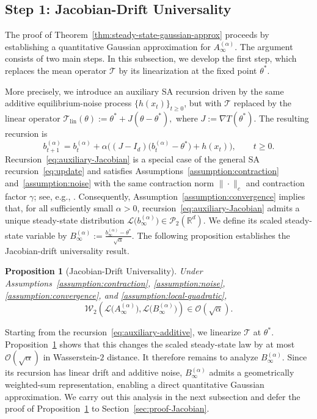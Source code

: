 \documentclass[11pt,letterpaper]{article}
\theoremstyle{plain}
\newtheorem{proposition}{Proposition}
\theoremstyle{definition}
\theoremstyle{remark}
\newcommand{\mT}{\mathcal{T}}
\newcommand{\W}{\mathcal{W}}
\newcommand{\law}{\mathcal{L}}
\begin{document}
\subsection{Step 1: Jacobian-Drift Universality}
\label{sec:Jacobian}

The proof of Theorem~\ref{thm:steady-state-gaussian-approx} proceeds by
establishing a quantitative Gaussian approximation for
\(A_\infty^{(\alpha)}\). The argument
consists of two main steps. In this subsection, we develop the first step,
which replaces the mean operator \(\mT\) by its linearization at the fixed
point \(\theta^*\).

More precisely, we introduce an auxiliary SA recursion driven by the same
additive equilibrium-noise process \(\{h(x_t)\}_{t\geq0}\), but with \(\mT\) replaced by
the linear operator $\mT_{\mathrm{lin}}(\theta)
    :=
    \theta^*+J(\theta-\theta^*),$ where $J:=\nabla T(\theta^*)$. The resulting recursion is
\begin{equation}
\label{eq:auxiliary-Jacobian}
    b_{t+1}^{(\alpha)}
    =
    b_t^{(\alpha)}
    +
    \alpha\Big(
        (J-I_d)\bigl(b_t^{(\alpha)}-\theta^*\bigr)
        +
        h(x_t)
    \Big),
    \qquad t\geq 0.
\end{equation}
Recursion~\eqref{eq:auxiliary-Jacobian} is a special case of the general SA
recursion~\eqref{eq:update} and satisfies
Assumptions~\ref{assumption:contraction} and~\ref{assumption:noise}
with the same contraction norm \(\|\cdot\|_c\) and contraction factor
\(\gamma\); see, e.g., \cite[Proposition~6.4]{arora2021alternative}.
Consequently, Assumption~\ref{assumption:convergence} implies that, for all
sufficiently small \(\alpha>0\),
recursion~\eqref{eq:auxiliary-Jacobian} admits a unique steady-state
distribution $\law\bigl(b_\infty^{(\alpha)}\bigr)
    \in \mathcal{P}_2(\mathbb{R}^d).$ We define its scaled steady-state variable by $B_\infty^{(\alpha)}
    :=
    \frac{b_\infty^{(\alpha)}-\theta^*}{\sqrt{\alpha}}.$ The following proposition establishes the Jacobian-drift universality result.


\begin{proposition}[Jacobian-Drift Universality]
\label{prop:Jacobian}
Under Assumptions~\ref{assumption:contraction},
\ref{assumption:noise}, \ref{assumption:convergence}, and
\ref{assumption:local-quadratic},
\[
    \W_2\left(
        \law\bigl(A_\infty^{(\alpha)}\bigr),
        \law\bigl(B_\infty^{(\alpha)}\bigr)
    \right)
   \in
    \mathcal{O}(\sqrt{\alpha}).
\]
\end{proposition}
Starting from the recursion~\eqref{eq:auxiliary-additive},
we linearize \(\mT\) at \(\theta^*\). Proposition~\ref{prop:Jacobian} shows
that this changes the scaled steady-state law by at most
\(\mathcal O(\sqrt{\alpha})\) in Wasserstein-\(2\) distance. It therefore remains to analyze \(B_\infty^{(\alpha)}\). Since its recursion
has linear drift and additive noise, \(B_\infty^{(\alpha)}\) admits a
geometrically weighted-sum representation, enabling a direct quantitative
Gaussian approximation. We carry out this analysis in the next subsection
and defer the proof of Proposition~\ref{prop:Jacobian} to
Section~\ref{sec:proof-Jacobian}.
\end{document}
